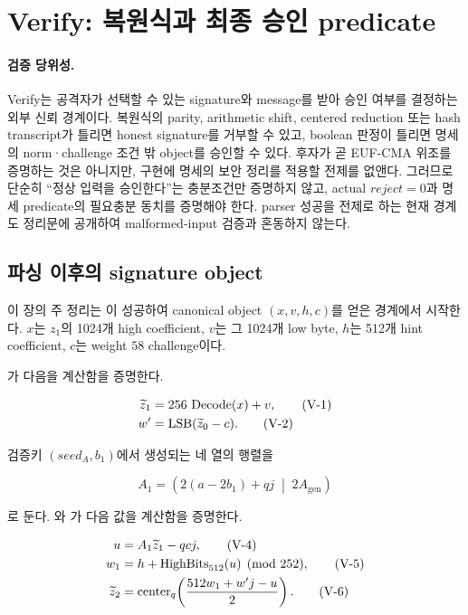 \section{Verify: 복원식과 최종 승인 predicate}
\label{sec:verify}

\paragraph{검증 당위성.}
Verify는 공격자가 선택할 수 있는 signature와 message를 받아 승인 여부를
결정하는 외부 신뢰 경계이다. 복원식의 parity, arithmetic shift, centered
reduction 또는 hash transcript가 틀리면 honest signature를 거부할 수 있고,
boolean 판정이 틀리면 명세의 norm·challenge 조건 밖 object를 승인할 수 있다.
후자가 곧 EUF-CMA 위조를 증명하는 것은 아니지만, 구현에 명세의 보안 정리를
적용할 전제를 없앤다. 그러므로 단순히 ``정상 입력을 승인한다''는 충분조건만
증명하지 않고, actual \(reject=0\)과 명세 predicate의 필요충분 동치를
증명해야 한다. parser 성공을 전제로 하는 현재 경계도 정리문에 공개하여
malformed-input 검증과 혼동하지 않는다.

\subsection{파싱 이후의 signature object}

이 장의 주 정리는 이 성공하여 canonical object
\((x,v,h,c)\)를 얻은 경계에서 시작한다. \(x\)는 \(z_1\)의 1024개 high
coefficient, \(v\)는 그 1024개 low byte, \(h\)는 512개 hint coefficient,
\(c\)는 weight \(58\) challenge이다.

가 다음을 계산함을 증명한다.

\begin{align}
\widetilde z_1 &=256\,\operatorname{Decode}(x)+v, \tag{V-1}\\
w'&=\operatorname{LSB}(\widetilde z_0-c). \tag{V-2}
\end{align}

검증키 \((seed_A,b_1)\)에서 생성되는 네 열의 행렬을

\[
  A_1=\left(2(a-2b_1)+qj\;\middle|\;2A_{\mathrm{gen}}\right)
  \tag{V-3}
\]

로 둔다. 와
가 다음 값을 계산함을 증명한다.

\begin{align}
u &= A_1\widetilde z_1-qcj, \tag{V-4}\\
w_1 &= h+\operatorname{HighBits}_{512}(u)\pmod{252}, \tag{V-5}\\
\widetilde z_2
 &=\operatorname{center}_{q}\!\left(\frac{512w_1+w'j-u}{2}\right). \tag{V-6}
\end{align}

